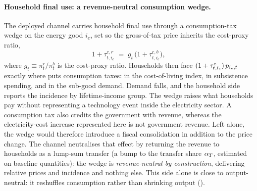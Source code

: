 \paragraph{Household final use: a revenue-neutral consumption wedge.}
The deployed channel carries household final use through a consumption-tax wedge on the
energy good $i_e$, set so the gross-of-tax price inherits the cost-proxy ratio,
\begin{equation}
  1 + \tau^{c,r}_{t,i_e} \;=\; g_t\,\bigl(1 + \tau^{c,b}_{t,i_e}\bigr),
  \label{eq:routeA}
\end{equation}
where $g_t \equiv \pi^{r}_t/\pi^{b}_t$ is the \CLEWS{} cost-proxy ratio. Households then
face $(1+\tau^{c}_{t,i_e})\,p_{i_e,t}$ exactly where \OGCore{} puts consumption taxes:
in the cost-of-living index, in subsistence spending, and in the sub-good demand.
Demand falls, and the household side reports the incidence by lifetime-income
group. The wedge raises what households pay without representing a technology event
inside the electricity sector. A consumption tax also credits the government with
revenue, whereas the electricity-cost increase represented here is not government
revenue. Left alone, the wedge would therefore introduce a fiscal consolidation in
addition to the price change. The channel neutralises that effect by returning the revenue to
households as a lump-sum transfer (a bump to the transfer share $\alpha_{T}$, estimated
on baseline quantities): the wedge is \emph{revenue-neutral by construction},
delivering relative prices and incidence and nothing else. This side alone is close
to output-neutral: it reshuffles consumption rather than shrinking output
().

